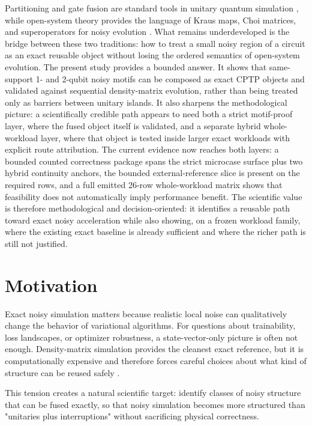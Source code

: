 Partitioning and gate fusion are standard tools in unitary quantum simulation
\cite{r7,r8,r10,r9}, while open-system theory provides the language of Kraus maps,
Choi matrices, and superoperators for noisy evolution \cite{r2,r3}. What
remains underdeveloped is the
bridge between these two traditions: how to treat a small noisy region of a
circuit as an exact reusable object without losing the ordered semantics of
open-system evolution. The present study provides a bounded answer. It shows
that same-support 1- and 2-qubit noisy motifs can be composed as exact CPTP
objects and validated against sequential density-matrix evolution, rather than
being treated only as barriers between unitary islands. It also sharpens the
methodological picture: a scientifically credible path appears to need both a
strict motif-proof layer, where the fused object itself is validated, and a
separate hybrid whole-workload layer, where that object is tested inside larger
exact workloads with explicit route attribution. The current evidence now
reaches both layers: a bounded counted correctness package spans the strict
microcase surface plus two hybrid continuity anchors, the bounded
external-reference slice is present on the required rows, and a full emitted
26-row whole-workload matrix shows that feasibility does not automatically
imply performance benefit. The scientific value is therefore methodological and
decision-oriented: it identifies a reusable path toward exact noisy
acceleration while also showing, on a frozen workload family, where the
existing exact baseline is already sufficient and where the richer path is
still not justified.

\section{Motivation}

Exact noisy simulation matters because realistic local noise can qualitatively
change the behavior of variational algorithms. For questions about trainability,
loss landscapes, or optimizer robustness, a state-vector-only picture is often
not enough. Density-matrix simulation provides the cleanest exact reference, but
it is computationally expensive and therefore forces careful choices about what
kind of structure can be reused safely \cite{r4,r5,r6}.

This tension creates a natural scientific target: identify classes of noisy
structure that can be fused exactly, so that noisy simulation becomes more
structured than "unitaries plus interruptions" without sacrificing physical
correctness.

